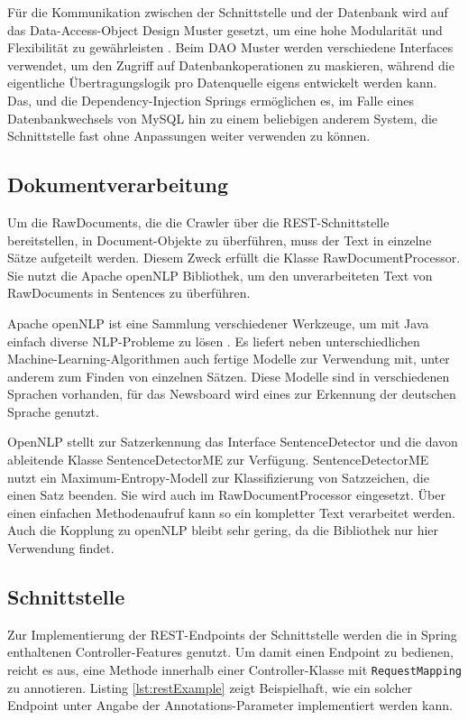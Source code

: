 Für die Kommunikation zwischen der Schnittstelle und der Datenbank wird auf das
Data-Access-Object Design Muster gesetzt, um eine hohe Modularität und Flexibilität zu
gewährleisten \cite{dao-pattern}. Beim DAO Muster werden verschiedene Interfaces
verwendet, um den Zugriff auf Datenbankoperationen zu maskieren, während die eigentliche
Übertragungslogik pro Datenquelle eigens entwickelt werden kann. Das, und die
Dependency-Injection Springs ermöglichen es, im Falle eines Datenbankwechsels von
MySQL hin zu einem beliebigen anderem System, die Schnittstelle fast ohne Anpassungen
weiter verwenden zu können.

\subsection{Dokumentverarbeitung}
Um die RawDocuments, die die Crawler über die REST-Schnittstelle bereitstellen,
in Document-Objekte zu überführen, muss der Text in einzelne Sätze aufgeteilt werden.
Diesem Zweck erfüllt die Klasse RawDocumentProcessor. Sie nutzt die
Apache openNLP Bibliothek, um den unverarbeiteten Text von RawDocuments in Sentences zu
überführen.

Apache openNLP ist eine Sammlung verschiedener Werkzeuge, um mit Java einfach diverse 
NLP-Probleme zu lösen \cite{opennlp}. Es liefert neben unterschiedlichen 
Machine-Learning-Algorithmen auch fertige Modelle zur Verwendung mit, unter anderem
zum Finden von einzelnen Sätzen. Diese Modelle sind in verschiedenen Sprachen vorhanden,
für das Newsboard wird eines zur Erkennung der deutschen Sprache genutzt.

OpenNLP stellt zur Satzerkennung das Interface SentenceDetector und die davon ableitende
Klasse SentenceDetectorME zur Verfügung. SentenceDetectorME nutzt ein Maximum-Entropy-Modell
zur Klassifizierung von Satzzeichen, die einen Satz beenden. Sie wird auch im
RawDocumentProcessor eingesetzt. Über einen einfachen Methodenaufruf kann so ein kompletter
Text verarbeitet werden. Auch die Kopplung zu openNLP bleibt sehr gering, da die
Bibliothek nur hier Verwendung findet.

\subsection{Schnittstelle}
Zur Implementierung der REST-Endpoints der Schnittstelle werden die in Spring enthaltenen
Controller-Features genutzt. Um damit einen Endpoint zu bedienen, reicht es aus,
eine Methode innerhalb einer Controller-Klasse mit \texttt{RequestMapping} zu annotieren.
Listing \ref{lst:restExample} zeigt Beispielhaft, wie ein solcher Endpoint unter Angabe der
Annotations-Parameter implementiert werden kann.

